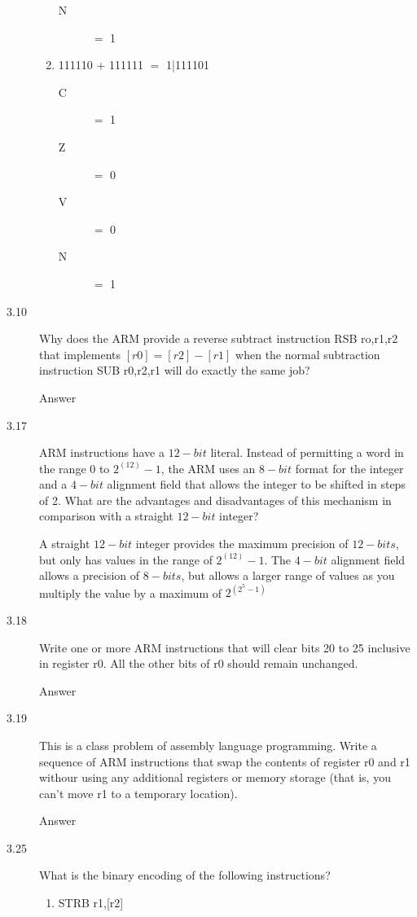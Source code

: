 \documentclass[letterpaper,10pt,titlepage]{article}
\begin{document}
\begin{description}
\begin{enumerate}
\begin{description}
            \item[N] $=$ 1
        \end{description}
        \item 111110 $+$ 111111 $=$ 1|111101
        \begin{description}
            \item[C] $=$ 1
            \item[Z] $=$ 0
            \item[V] $=$ 0
            \item[N] $=$ 1
        \end{description}
    \end{enumerate}
    \item[3.10] Why does the ARM provide a reverse subtract instruction RSB ro,r1,r2 that implements $[r0] = [r2] - [r1]$ when the normal subtraction instruction SUB r0,r2,r1 will do exactly the same job?
    
    Answer
    \item[3.17] ARM instructions have a $12-bit$ literal. Instead of permitting a word in the range 0 to $2^(12) - 1$, the ARM uses an $8-bit$ format for the integer and a $4-bit$ alignment field that allows the integer to be shifted in steps of 2. What are the advantages and disadvantages of this mechanism in comparison with a straight $12-bit$ integer?
    
    A straight $12-bit$ integer provides the maximum precision of $12-bits$, but only has values in the range of $2^(12) - 1$. The $4-bit$ alignment field allows a precision of $8-bits$, but allows a larger range of values as you multiply the value by a maximum of $2^(2^5 - 1)$ 
    \item[3.18] Write one or more ARM instructions that will clear bits 20 to 25 inclusive in register r0. All the other bits of r0 should remain unchanged.
    
    Answer
    \item[3.19] This is a class problem of assembly language programming. Write a sequence of ARM instructions that swap the contents of register r0 and r1 withour using any additional registers or memory storage (that is, you can't move r1 to a temporary location).
    
    Answer
    \item[3.25] What is the binary encoding of the following instructions?
    \begin{enumerate}
        \item STRB r1,[r2]
        

\end{enumerate}
\end{description}
\end{document}

